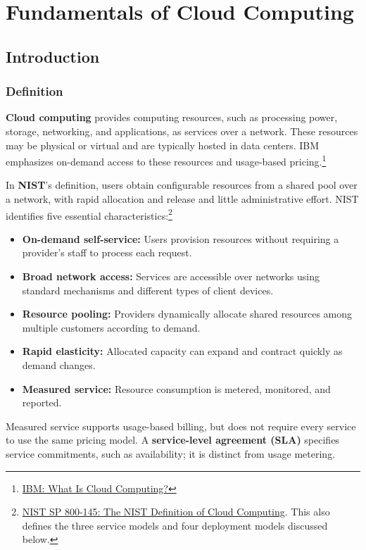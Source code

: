\chapter{Fundamentals of Cloud Computing}

\section{Introduction}

\subsection{Definition}
\textbf{Cloud computing} provides computing resources, such as processing power, storage, networking, and applications, as services over a network. These resources may be physical or virtual and are typically hosted in data centers. IBM emphasizes on-demand access to these resources and usage-based pricing.\footnote{\href{https://www.ibm.com/think/topics/cloud-computing}{IBM: What Is Cloud Computing?}}

In \textbf{NIST}'s definition, users obtain configurable resources from a shared pool over a network, with rapid allocation and release and little administrative effort. NIST identifies five essential characteristics:\footnote{\href{https://doi.org/10.6028/NIST.SP.800-145}{NIST SP 800-145: The NIST Definition of Cloud Computing}. This also defines the three service models and four deployment models discussed below.}

\begin{itemize}
  \item \textbf{On-demand self-service:} Users provision resources without requiring a provider's staff to process each request.
  \item \textbf{Broad network access:} Services are accessible over networks using standard mechanisms and different types of client devices.
  \item \textbf{Resource pooling:} Providers dynamically allocate shared resources among multiple customers according to demand.
  \item \textbf{Rapid elasticity:} Allocated capacity can expand and contract quickly as demand changes.
  \item \textbf{Measured service:} Resource consumption is metered, monitored, and reported.
\end{itemize}

Measured service supports usage-based billing, but does not require every service to use the same pricing model. A \textbf{service-level agreement (SLA)} specifies service commitments, such as availability; it is distinct from usage metering.

